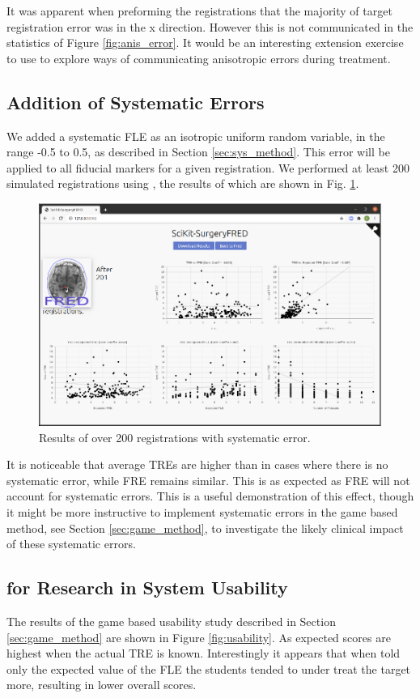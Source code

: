 It was apparent when preforming the registrations that the majority of target 
registration error was in the x direction. However this is not communicated in the 
statistics of Figure \ref{fig:anis_error}. It would be an interesting extension 
exercise to use \fred to explore ways of communicating anisotropic errors during 
treatment.

\subsection{Addition of Systematic Errors}
We added a systematic \gls{FLE} as an isotropic uniform random variable, in the range
-0.5 to 0.5, as described in Section \ref{sec:sys_method}. This error will be applied to all fiducial markers for a 
given registration. We performed at least 200 simulated registrations using \fred, the results of which are shown in Fig. \ref{fig:sys_error}.
\begin{figure}
	\begin{center}
			\includegraphics[width=0.9\linewidth]{images/systematic_error.eps}
			\caption{\label{fig:sys_error}Results of over 200 registrations with systematic error.}
	\end{center}
\end{figure}

It is noticeable that average \gls{TRE}s are higher than in cases where there is no
systematic error, while \gls{FRE} remains similar. This is as expected as \gls{FRE} will 
not account for systematic errors. This is a useful demonstration of this effect, though 
it might be more instructive to implement systematic errors in the game based method, see
Section \ref{sec:game_method}, to investigate the likely clinical impact of these
systematic errors.

\subsection{\fred for Research in System Usability}
The results of the game based usability study described in Section \ref{sec:game_method}
are shown in 
Figure \ref{fig:usability}. As expected scores are 
highest when the actual \gls{TRE} is known. Interestingly it appears that when told only the expected value of the \gls{FLE} the students
tended to under treat the target more, resulting in lower overall scores. 


